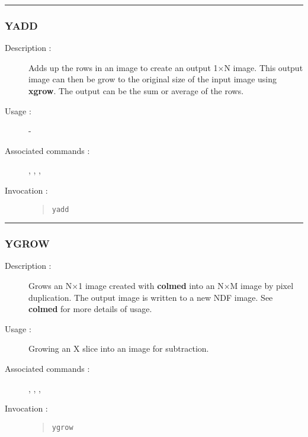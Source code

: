 \hrule 
\subsubsection*{\label{YADD}YADD}

\begin{description}

\item[Description :] Adds up the rows in an image to create an output
1$\times$N image.  This output image can then be grow to the original
size of the input image using {\bf xgrow}.  The output can be the sum or
average of the rows.

\item[Usage :] -

\item[Associated commands :] {\tt {}}, 
{\tt {}}, {\tt {}}, 
{\tt {}}

\item[Invocation :]

\begin{quote}{\tt  yadd }\end{quote}

\end{description}

\hrule 
\subsubsection*{\label{YGROW}YGROW}

\begin{description}

\item[Description :] Grows an N$\times$1 image created with {\bf colmed} 
into an N$\times$M image by pixel duplication.  The output
image is written to a new NDF image.  See {\bf colmed} for more details of
usage.

\item[Usage :] Growing an X slice into an image for subtraction.

\item[Associated commands :] {\tt {}}, 
{\tt {}}, {\tt {}}, 
{\tt {}}

\item[Invocation :]

\begin{quote}{\tt  ygrow }\end{quote}

\end{description}

